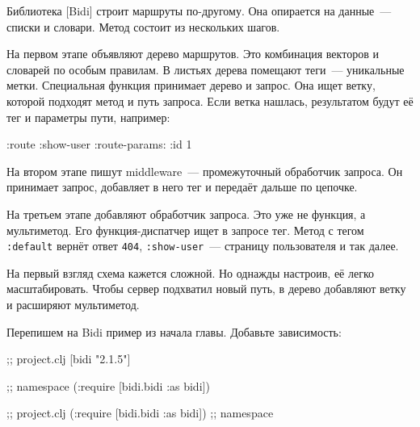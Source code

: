 
Библиотека [Bidi] строит маршруты
по-другому. Она опирается на данные~--- списки и словари. Метод состоит из
нескольких шагов.

На первом этапе объявляют дерево маршрутов. Это комбинация векторов и словарей
по особым правилам. В листьях дерева помещают теги~--- уникальные
метки. Специальная функция принимает дерево и запрос. Она ищет ветку, которой
подходят метод и путь запроса. Если ветка нашлась, результатом будут её тег и
параметры пути, например:

\begin{english}
  \begin{clojure}
{:route :show-user :route-params: {:id 1}}
  \end{clojure}
\end{english}


На втором этапе пишут middleware~--- промежуточный обработчик запроса. Он
принимает запрос, добавляет в него тег и передаёт дальше по цепочке.

На третьем этапе добавляют обработчик запроса. Это уже не функция, а
мультиметод. Его функция-диспатчер ищет в запросе тег. Метод с тегом
\verb|:default| вернёт ответ \verb|404|, \verb|:show-user|~--- страницу
пользователя и так далее.

На первый взгляд схема кажется сложной. Но однажды настроив, её легко
масштабировать. Чтобы сервер подхватил новый путь, в дерево добавляют ветку и
расширяют мультиметод.


Перепишем на Bidi пример из начала главы. Добавьте зависимость:

\ifnarrow

\begin{english}
  \begin{clojure}
;; project.clj
[bidi "2.1.5"]

;; namespace
(:require [bidi.bidi :as bidi])
  \end{clojure}
\end{english}

\else

\begin{english}
  \begin{clojure}
[bidi "2.1.5"]                  ;; project.clj
(:require [bidi.bidi :as bidi]) ;; namespace
  \end{clojure}
\end{english}

